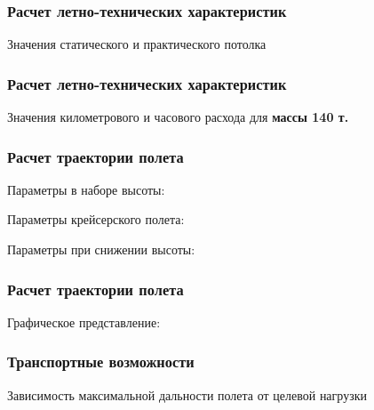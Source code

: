 \documentclass{beamer}
\begin{document}
\begin{frame}[t]
    \frametitle{Расчет летно-технических характеристик}
    \begin{center}
        Значения статического и практического потолка
        \resizebox{.79\linewidth}{!}{}
    \end{center}
\end{frame}
\begin{frame}[t]
    \frametitle{Расчет летно-технических характеристик}
    \begin{center}
        Значения километрового и часового расхода для \textbf{массы 140 т.}
        \resizebox{.79\linewidth}{!}{}
    \end{center}
\end{frame}
\begin{frame}[t]
    \frametitle{Расчет траектории полета}

    \begin{center}
        Параметры в наборе высоты:

        
        \vfill
        Параметры крейсерского полета:
        
        \vfill
        Параметры  при снижении высоты:

        
    \end{center}
\end{frame}

\begin{frame}[t]
    \frametitle{Расчет траектории полета}
    \begin{center}
        Графическое представление:
        \resizebox{.79\linewidth}{!}{}
    \end{center}
\end{frame}

\begin{frame}[t]
    \frametitle{Транспортные возможности}
    \begin{center}
        Зависимость максимальной дальности полета от целевой нагрузки

        \resizebox{.79\linewidth}{!}{}
    \end{center}
\end{frame}
\end{document}
